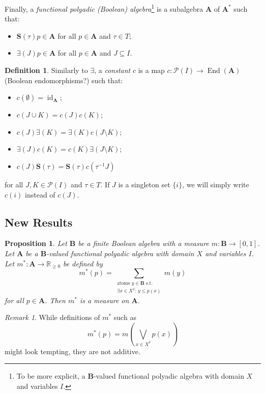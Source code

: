 \documentclass{article}
\newtheorem{proposition}{Proposition}
\theoremstyle{definition}
\newtheorem{definition}{Definition}
\theoremstyle{remark}
\newtheorem*{remark}{Remark}
\DeclareMathOperator{\id}{id}
\DeclareMathOperator{\End}{End}
\begin{document}
Finally, a \emph{functional polyadic (Boolean) algebra}\footnote{To be more
  explicit, a $\mathbf{B}$-valued functional polyadic algebra with domain $X$
  and variables $I$.} is a subalgebra
$\mathbf{A}$ of $\mathbf{A^*}$ such that:
\begin{itemize}
\item $\mathbf{S}(\tau)p \in \mathbf{A}$ for all $p \in \mathbf{A}$ and $\tau
  \in T$;
\item $\bm\exists(J)p \in \mathbf{A}$ for all $p \in \mathbf{A}$ and $J
  \subseteq I$.
\end{itemize}

\begin{definition}
  Similarly to $\bm\exists$, a \emph{constant} $c$ is a map $c: \mathcal{P}(I)
  \to \End(\mathbf{A})$ (Boolean endomorphisms?) such that:
  \begin{itemize}
  \item $c(\emptyset) = \id_{\mathbf{A}}$;
  \item $c(J \cup K) = c(J)c(K)$;
  \item $c(J)\bm\exists(K) = \bm\exists(K)c(J \setminus K)$;
  \item $\bm\exists(J)c(K) = c(K)\bm\exists(J \setminus K)$;
  \item $c(J)\mathbf{S}(\tau) = \mathbf{S}(\tau)c(\tau^{-1}J)$
  \end{itemize}
  for all $J, K \in \mathcal{P}(I)$ and $\tau \in T$. If $J$ is a singleton
  set $\{ i \}$, we will simply write $c(i)$ instead of $c(J)$.
\end{definition}

\subsection{New Results}

\begin{proposition} \label{prop:polyadic_measure}
  Let $\mathbf{B}$ be a finite Boolean algebra with a measure $m :
  \mathbf{B} \to [0, 1]$. Let $\mathbf{A}$ be a $\mathbf{B}$-valued functional
  polyadic algebra with domain $X$ and variables $I$. Let $m^* : \mathbf{A} \to
  \mathbb{R}_{\ge 0}$ be defined by
  \[
    m^*(p) = \sum_{\substack{\text{atoms }y \in \mathbf{B} \text{ s.t.}\\ \exists x \in X^I:\, y \le p(x)}} m(y)
  \]
  for all $p \in \mathbf{A}$. Then $m^*$ is a measure on $\mathbf{A}$.
\end{proposition}

\begin{remark}
  While definitions of $m^*$ such as
  \[
    m^*(p) = m \left( \bigvee_{x \in X^I} p(x) \right)
  \]
  might look tempting, they are not additive.
\end{remark}
\end{document}
